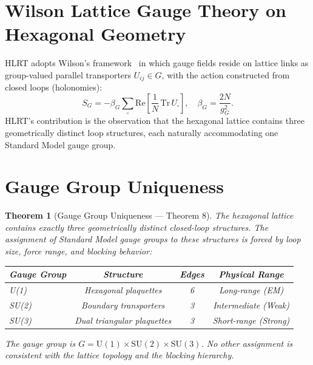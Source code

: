 \documentclass[11pt,letterpaper]{article}
\newtheorem{theorem}{Theorem}[section]
\begin{document}
\section{Wilson Lattice Gauge Theory on Hexagonal Geometry}

HLRT adopts Wilson's framework~\cite{Wilson1974} in which gauge fields reside
on lattice links as group-valued parallel transporters $U_{ij}\in G$, with the
action constructed from closed loops (holonomies):
\begin{equation}\label{eq:wilson}
  S_G = -\beta_G \sum_{\square}
  \mathrm{Re}\!\left[\frac{1}{N}\,\mathrm{Tr}\,U_\square\right],
  \quad \beta_G = \frac{2N}{g_G^2}.
\end{equation}
HLRT's contribution is the observation that the hexagonal lattice contains
three geometrically distinct loop structures, each naturally accommodating
one Standard Model gauge group.

\section{Gauge Group Uniqueness}\label{sec:gauge}

\begin{theorem}[Gauge Group Uniqueness --- Theorem 8]\label{thm:T8}
The hexagonal lattice contains exactly three geometrically distinct
closed-loop structures.  The assignment of Standard Model gauge groups
to these structures is forced by loop size, force range, and blocking
behavior:
\begin{center}
\begin{tabular}{lccc}
\toprule
\textbf{Gauge Group} & \textbf{Structure} & \textbf{Edges} & \textbf{Physical Range} \\
\midrule
U(1)   & Hexagonal plaquettes          & 6 & Long-range (EM) \\
SU(2)  & Boundary transporters         & 3 & Intermediate (Weak) \\
SU(3)  & Dual triangular plaquettes    & 3 & Short-range (Strong) \\
\bottomrule
\end{tabular}
\end{center}
The gauge group is $G = \mathrm{U}(1)\times\mathrm{SU}(2)\times\mathrm{SU}(3)$.
No other assignment is consistent with the lattice topology and
the blocking hierarchy.
\end{theorem}
\end{document}
